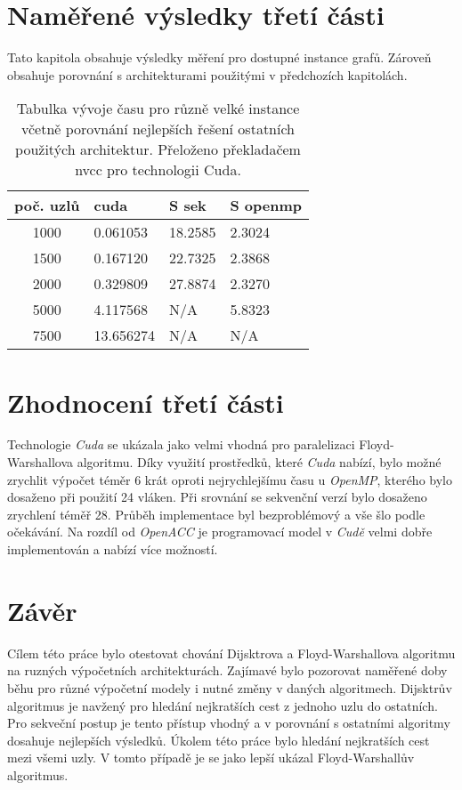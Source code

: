 \documentclass[a4paper,11pt]{article}
\begin{document}
    \section{Naměřené výsledky třetí části} \label{vysledky3} 
    Tato kapitola obsahuje výsledky měření pro dostupné instance grafů. Zároveň obsahuje porovnání 
    s architekturami použitými v předchozích kapitolách.
    
  \begin{table}[ht]
  \begin{center}
   \begin{tabular}{|c|l|l|l|}
    \hline 
    poč. uzlů & cuda & S sek & S openmp\\
   \hline 
   \hline 
   1000 & 0.061053 & 18.2585 & 2.3024\\
   \hline
    1500 & 0.167120 & 22.7325 & 2.3868\\           
    \hline
    2000 & 0.329809 & 27.8874 & 2.3270\\
    \hline
    5000 & 4.117568 & N/A  & 5.8323 \\
    \hline
    7500 & 13.656274 & N/A & N/A\\
   \hline
   
    \end{tabular}
   \caption{Tabulka vývoje času pro různě velké instance včetně porovnání nejlepších řešení 
   ostatních použitých architektur. Přeloženo překladačem nvcc pro technologii Cuda.} 
   \label{tab.tab40}
  \end{center}   
  \end{table}
    
    
     \section{Zhodnocení třetí části} 
    Technologie \textit{Cuda} se ukázala jako velmi vhodná pro paralelizaci Floyd-Warshallova algoritmu. 
    Díky využití prostředků, které \textit{Cuda} nabízí, bylo možné zrychlit výpočet téměr 6 krát oproti 
    nejrychlejšímu času u \textit{OpenMP}, kterého bylo dosaženo při použití 24 vláken. Při srovnání se sekvenční verzí 
    bylo dosaženo zrychlení téměř 28. 
    Průběh implementace byl bezproblémový a vše šlo podle očekávání. Na rozdíl od \textit{OpenACC} je programovací 
    model v \textit{Cudě} velmi dobře implementován a nabízí více možností.  
    
     \section{Závěr}
     Cílem této práce bylo otestovat chování Dijsktrova a Floyd-Warshallova algoritmu na ruzných výpočetních 
     architekturách. Zajímavé bylo pozorovat naměřené doby běhu pro různé výpočetní modely i nutné změny 
     v daných algoritmech. Dijsktrův algoritmus je navžený pro hledání nejkratších cest z jednoho uzlu do ostatních. 
     Pro sekveční postup je tento přístup vhodný a v porovnání s ostatními algoritmy dosahuje nejlepších výsledků. 
     Úkolem této práce bylo hledání nejkratších cest mezi všemi uzly. V tomto případě je se jako lepší ukázal 
     Floyd-Warshallův algoritmus. 
     
\end{document}
